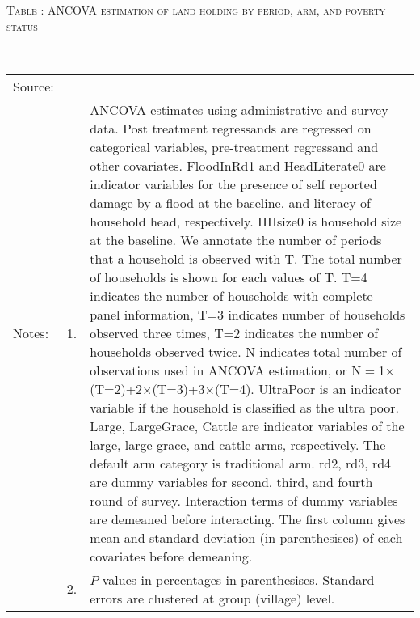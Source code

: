 \hspace{-1cm}\begin{minipage}[t]{14cm}
\hfil\textsc{\normalsize Table \thetable: ANCOVA estimation of land holding by period, arm, and poverty status\label{tab ANCOVA land period poverty}}\\
\setlength{\tabcolsep}{1pt}
\setlength{\baselineskip}{8pt}
\renewcommand{\arraystretch}{.55}
\hfil{}\\
\renewcommand{\arraystretch}{.8}
\setlength{\tabcolsep}{1pt}
\begin{tabular}{>{\hfill\scriptsize}p{1cm}<{}>{\hfill\scriptsize}p{.25cm}<{}>{\scriptsize}p{12cm}<{\hfill}}
Source:& \multicolumn{2}{l}{\scriptsize Estimated with GUK administrative and survey data.}\\
Notes: & 1. & ANCOVA estimates using administrative and survey data. Post treatment regressands are regressed on categorical variables, pre-treatment regressand and other covariates. \textsf{FloodInRd1} and \textsf{HeadLiterate0} are indicator variables for the presence of self reported damage by a flood at the baseline, and literacy of household head, respectively. \textsf{HHsize0} is household size at the baseline. We annotate the number of periods that a household is observed with \textsf{T}. The total number of households is shown for each values of \textsf{T}. \textsf{T=4} indicates the number of households with complete panel information, \textsf{T=3} indicates number of households observed three times, \textsf{T=2} indicates the number of households observed twice. \textsf{N} indicates total number of observations used in ANCOVA estimation, or \textsf{N$=$1$\times$(T=2)+2$\times$(T=3)+3$\times$(T=4)}.  \textsf{UltraPoor} is an indicator variable if the household is classified as the ultra poor. \textsf{Large}, \textsf{LargeGrace}, \textsf{Cattle} are indicator variables of the \textsf{large}, \textsf{large grace}, and \textsf{cattle} arms, respectively. The default arm category is \textsf{traditional} arm. \textsf{rd2, rd3, rd4} are dummy variables for second, third, and fourth round of survey. Interaction terms of dummy variables are demeaned before interacting. The first column gives mean and standard deviation (in parenthesises) of each covariates before demeaning.\\
& 2. & $P$ values in percentages in parenthesises. Standard errors are clustered at group (village) level.
\end{tabular}
\end{minipage}

